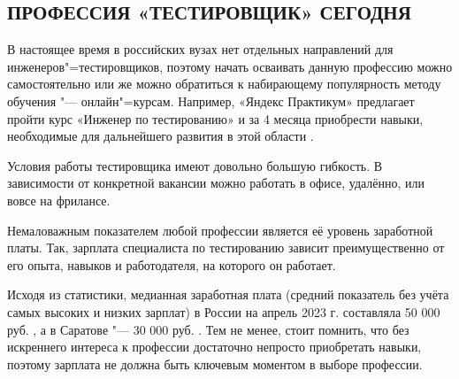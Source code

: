 \subsection{ПРОФЕССИЯ «ТЕСТИРОВЩИК» СЕГОДНЯ}
В настоящее время в российских вузах нет отдельных направлений для 
инженеров"=тестировщиков, поэтому начать осваивать данную профессию можно 
самостоятельно или же можно обратиться к набирающему популярность методу 
обучения "--- онлайн"=курсам. Например, «Яндекс Практикум» предлагает пройти 
курс «Инженер по тестированию» и за 4 месяца приобрести навыки, необходимые для 
дальнейшего развития в этой области \cite{Yandex}. 

Условия работы тестировщика имеют довольно большую гибкость. В зависимости от 
конкретной вакансии можно работать в офисе, удалённо, или вовсе на фрилансе.

Немаловажным показателем любой профессии является её уровень заработной платы. 
Так, зарплата специалиста по тестированию зависит преимущественно от его опыта, 
навыков и работодателя, на которого он работает.

Исходя из статистики, медианная заработная плата (средний показатель без учёта 
самых высоких и низких зарплат) в России на апрель 2023 г. составляла 50 000 руб.
\cite{Salary}, а в Саратове "--- 30 000 руб. \cite{salarySar}. 
Тем не менее, стоит помнить, что без искреннего интереса к профессии достаточно 
непросто приобретать навыки, поэтому зарплата не должна быть ключевым моментом в 
выборе профессии.
